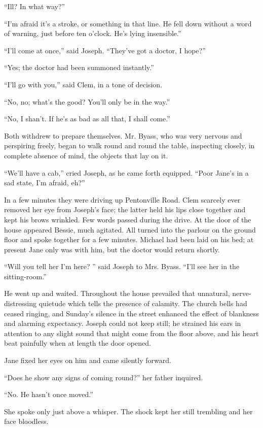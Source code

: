 ``Ill? In what way?''

``I'm afraid it's a stroke, or something in that line. He fell down
without a word of warning, just before ten o'clock. He's lying
insensible.''

``I'll come at once,'' said Joseph. ``They've got a doctor, I hope?''

``Yes; the doctor had been summoned instantly.''

``I'll go with you,'' said Clem, in a tone of decision.

``No, no; what's the good? You'll only be in the way.''

{}``No, I shan't. If he's as bad as all that, I shall come.''

Both withdrew to prepare themselves. Mr. Byass, who was very nervous and
perspiring freely, began to walk round and round the table, inspecting
closely, in complete absence of mind, the objects that lay on it.

``We'll have a cab,'' cried Joseph, as he came forth equipped. ``Poor
Jane's in a sad state, I'm afraid, eh?''

In a few minutes they were driving up Pentonville Road. Clem scarcely
ever removed her eye from Joseph's face; the latter held his lips close
together and kept his brows wrinkled. Few words passed during the drive.
At the door of the house appeared Bessie, much agitated. All turned into
the parlour on the ground floor and spoke together for a few minutes.
Michael had been laid on his bed; at present Jane only was with him, but
the doctor would return shortly.

``Will you tell her I'm here? '' said Joseph to Mrs. Byass. ``I'll see
her in the sitting-room.''

He went up and waited. Throughout the house prevailed that unnatural,
nerve-distressing quietude which tells the presence of {}calamity. The
church bells had ceased ringing, and Sunday's silence in the street
enhanced the effect of blankness and alarming expectancy. Joseph could
not keep still; he strained his ears in attention to any slight sound
that might come from the floor above, and his heart beat painfully when
at length the door opened.

Jane fixed her eyes on him and came silently forward.

``Does he show any signs of coming round?'' her father inquired.

``No. He hasn't once moved.''

She spoke only just above a whisper. The shock kept her still trembling
and her face bloodless.

